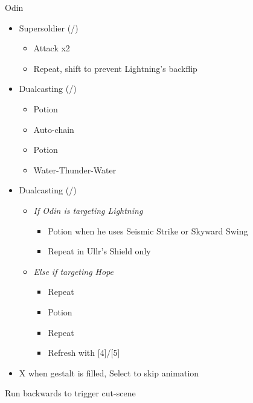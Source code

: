 \documentclass{report}
\begin{document}
\renewcommand{\first}{[1] Slash \& Burn (\com/\rav)}
\renewcommand{\second}{[2] Supersoldier (\com/\syn)}
\renewcommand{\fourth}{[4] Dualcasting (\rav/\rav)}
\renewcommand{\fifth}{[5] Dualcasting (\rav/\rav)}

\begin{battle}{Odin}
\begin{itemize}
    \item \second
    \begin{itemize}
        \item Attack x2
        \item Repeat, shift to prevent Lightning's backflip
    \end{itemize}
    \item \fourth
    \begin{itemize}
        \item Potion
        \item Auto-chain
        \item Potion
        \item Water-Thunder-Water
    \end{itemize}
    \item \fifth
    \begin{itemize}
        \item \textit{If Odin is targeting Lightning}
        \begin{itemize}
            \item Potion when he uses Seismic Strike or Skyward Swing
            \item Repeat in Ullr's Shield only
        \end{itemize}
        \item \textit{Else if targeting Hope}
        \begin{itemize}
            \item Repeat
            \item Potion
            \item Repeat
            \item Refresh with [4]/[5]
        \end{itemize}
    \end{itemize}
    \item X when gestalt is filled, Select to skip animation
\end{itemize}
\end{battle}

Run backwards to trigger cut-scene
\end{document}
